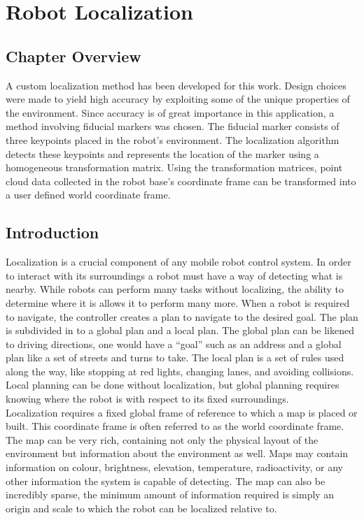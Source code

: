 \chapter{Robot Localization}
\label{chap:localiz}
\section{Chapter Overview}
A custom localization method has been developed for this work. Design choices were made to yield high accuracy by exploiting some of the unique properties of the environment. Since accuracy is of great importance in this application, a method involving fiducial markers was chosen. The fiducial marker consists of three keypoints placed in the robot's environment. The localization algorithm detects these keypoints and represents the location of the marker using a homogeneous transformation matrix. Using the transformation matrices, point cloud data collected in the robot base's coordinate frame can be transformed into a user defined world coordinate frame.\\

\section{Introduction}
Localization is a crucial component of any mobile robot control system. In order to interact with its surroundings a robot must have a way of detecting what is nearby. While robots can perform many tasks without localizing, the ability to determine where it is allows it to perform many more. When a robot is required to navigate, the controller creates a plan to navigate to the desired goal. The plan is subdivided in to a global plan and a local plan. The global plan can be likened to driving directions, one would have a ``goal'' such as an address and a global plan like a set of streets and turns to take. The local plan is a set of rules used along the way, like stopping at red lights, changing lanes, and avoiding collisions. Local planning can be done without localization, but global planning requires knowing where the robot is with respect to its fixed surroundings.\\

Localization requires a fixed global frame of reference to which a map is placed or built. This coordinate frame is often referred to as the world coordinate frame. The map can be very rich, containing not only the physical layout of the environment but information about the environment as well. Maps may contain information on colour, brightness, elevation, temperature, radioactivity, or any other information the system is capable of detecting. The map can also be incredibly sparse, the minimum amount of information required is simply an origin and scale to which the robot can be localized relative to.\\

